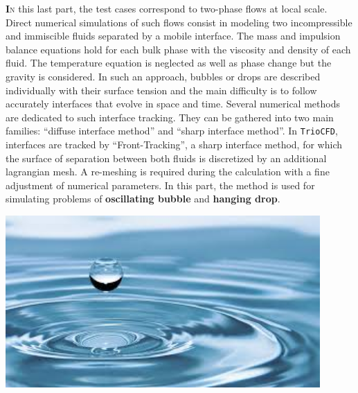 \lettrine[lines=2,slope=0pt,nindent=4pt]{\textbf{I}}{n} this last part, the test cases correspond to two-phase flows at
local scale. Direct numerical simulations of such flows consist in
modeling two incompressible and immiscible fluids separated by a mobile
interface. The mass and impulsion balance equations hold for each
bulk phase with the viscosity and density of each fluid. The temperature
equation is neglected as well as phase change but the gravity is considered.
In such an approach, bubbles or drops are described individually with
their surface tension and the main difficulty is to follow accurately
interfaces that evolve in space and time. Several numerical methods
are dedicated to such interface tracking. They can be gathered into
two main families: ``diffuse interface method'' and ``sharp interface
method''. In \texttt{TrioCFD}, interfaces are tracked by ``Front-Tracking'',
a sharp interface method, for which the surface of separation between
both fluids is discretized by an additional lagrangian mesh. A re-meshing
is required during the calculation with a fine adjustment of numerical
parameters. In this part, the method is used for simulating problems
of \textbf{oscillating bubble} and \textbf{hanging drop}.\vspace*{3cm} \newline
\begin{center}\includegraphics[width=12cm]{tools/goutte.png}\end{center}
